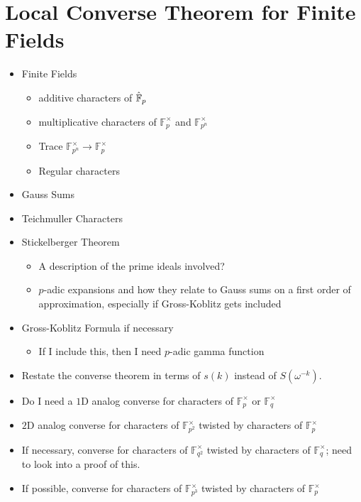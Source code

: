 \chapter{Local Converse Theorem for Finite Fields}	%
\begin{itemize}
\item Finite Fields 
\begin{itemize}
\item additive characters of $\hat{\mathbb{F}}_p$
\item multiplicative characters of $\mathbb{F}_p^\times$ and $\mathbb{F}_{p^n}^\times$
\item Trace $\mathbb{F}_{p^n}^\times \to \mathbb{F}_{p}^\times$
\item Regular characters
\end{itemize}
\item Gauss Sums 
\item Teichmuller Characters 
\item Stickelberger Theorem 
\begin{itemize}
\item A description of the prime ideals involved?
\item $p$-adic expansions and how they relate to Gauss sums on a first order of approximation, especially if Gross-Koblitz gets included
\end{itemize}
\item Gross-Koblitz Formula if necessary 
\begin{itemize}
\item If I include this, then I need $p$-adic gamma function
\end{itemize}
\item Restate the converse theorem in terms of $s(k)$ instead of $S(\omega^{-k})$.
\item Do I need a $1$D analog converse for characters of $\mathbb{F}_p^\times$ or $\mathbb{F}_q^\times$ 
\item $2$D analog converse for characters of $\mathbb{F}_{p^2}^\times$ twisted by characters of $\mathbb{F}_{p}^\times$ 
\item If necessary, converse for characters of $\mathbb{F}_{q^2}^\times$ twisted by characters of $\mathbb{F}_{q}^\times$; need to look into a proof of this.
\item If possible, converse for characters of $\mathbb{F}_{p^3}^\times$ twisted by characters of $\mathbb{F}_{p}^\times$ 
\end{itemize}

